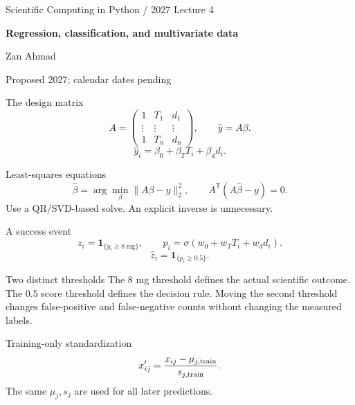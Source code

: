 \documentclass[aspectratio=169,11pt]{beamer}
\newcommand{\notestarget}{notes.pdf}\newcommand{\noteslabel}{Notes}
\begin{document}
\begin{frame}[plain]\vfill
{\small\color{accent} Scientific Computing in Python / 2027 \quad Lecture 4}\par\medskip
{\raggedright{}\LARGE\bfseries\color{ink} Regression, classification, and multivariate data}\par\bigskip
Zan Ahmad\par\smallskip
{\small Proposed 2027; calendar dates pending}\par\vfill\end{frame}
\renewcommand{\notestarget}{notes.pdf\#note-the-design-matrix}
\begin{frame}[t,fragile,label=slide-the-design-matrix]{The design matrix}
\[
A=\begin{pmatrix}1&T_1&d_1\\\vdots&\vdots&\vdots\\1&T_n&d_n\end{pmatrix},\qquad
\widehat y=A\beta.
\]
\pause{}
\[
\widehat y_i=\beta_0+\beta_TT_i+\beta_dd_i.
\]
\end{frame}
\renewcommand{\notestarget}{notes.pdf\#note-the-design-matrix}
\begin{frame}[t,fragile,label=slide-least-squares-equations]{Least-squares equations}
\[
\widehat\beta=\arg\min_\beta\|A\beta-y\|_2^2,
\qquad A^{\mathsf T}(A\widehat\beta-y)=0.
\]
\pause{}
Use a QR/SVD-based solve. An explicit inverse is unnecessary.
\end{frame}
\renewcommand{\notestarget}{notes.pdf\#note-a-success-event}
\begin{frame}[t,fragile,label=slide-a-success-event]{A success event}
\[
z_i=\mathbf1_{\{y_i\geq8\ \mathrm{mg}\}},\qquad
p_i=\sigma(w_0+w_TT_i+w_dd_i).
\]
\pause{}
\[
\widehat z_i=\mathbf1_{\{p_i\geq0.5\}}.
\]
\end{frame}
\renewcommand{\notestarget}{notes.pdf\#note-a-success-event}
\begin{frame}[t,fragile,label=slide-two-distinct-thresholds]{Two distinct thresholds}
The $8$ mg threshold defines the actual scientific outcome.
\pause{}
The $0.5$ score threshold defines the decision rule. Moving the second threshold changes false-positive and false-negative counts without changing the measured labels.
\end{frame}
\renewcommand{\notestarget}{notes.pdf\#note-training-only-standardization}
\begin{frame}[t,fragile,label=slide-training-only-standardization]{Training-only standardization}
\[
x'_{ij}=\frac{x_{ij}-\mu_{j,\rm train}}{s_{j,\rm train}}.
\]
\pause{}
The same $\mu_j,s_j$ are used for all later predictions.
\end{frame}
\end{document}
